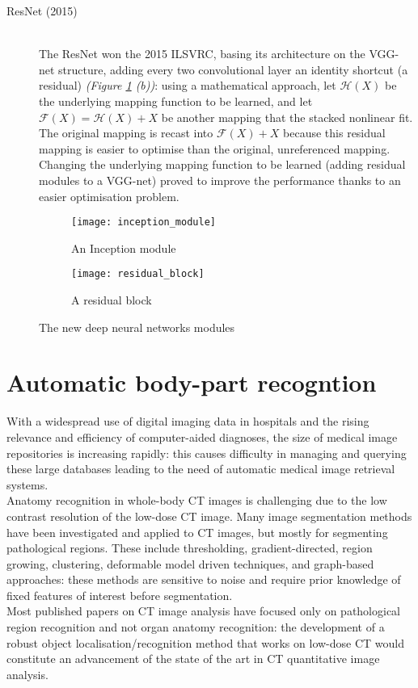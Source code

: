 \documentclass[../main.tex]{subfiles}
\begin{document}
\begin{description}
\item[ResNet (2015)] \cite{Wu2017} \hfill \\
The ResNet won the 2015 ILSVRC, basing its architecture on the VGG-net structure, adding every two convolutional layer an identity shortcut (a residual) \textit{(Figure \ref{fig:blocks} (b))}: using a mathematical approach, let $\mathcal {H}(X)$ be the underlying mapping function to be learned, and let $\mathcal{F}(X)=\mathcal {H}(X) + X $ be another mapping that the stacked nonlinear fit. The original mapping is recast into $\mathcal{F}(X)+X$ because this residual mapping is easier to optimise than the original, unreferenced mapping. \cite{Wu2017} \\
Changing the underlying mapping function to be learned (adding residual modules to a VGG-net) proved to improve the performance thanks to an easier optimisation problem.
\end{description}


\begin{figure}[H]
   \centering
    \begin{subfigure}{0.4\linewidth}
        \texttt{[image: inception\_module]}
        \caption{An Inception module} \cite{Szegedy2015}
    \end{subfigure}
    \begin{subfigure}{0.4\linewidth}
        \texttt{[image: residual\_block]}
        \caption{A residual block} \cite{Wu2017}
    \end{subfigure}
   
  \caption{The new deep neural networks modules}
  \label{fig:blocks}
\end{figure}


\clearpage
\newpage
\section{Automatic body-part recogntion}
With a widespread use of digital imaging data in hospitals and the rising relevance and efficiency of computer-aided diagnoses, the size of medical image repositories is increasing rapidly: this causes difficulty in managing and querying these large databases leading to the need of automatic medical image retrieval systems. \cite{Qayyum2017} \\

Anatomy recognition in whole-body CT images is challenging due to the low contrast resolution of the low-dose CT image. Many image segmentation methods have been investigated and applied to CT images, but mostly for segmenting pathological regions. These include thresholding, gradient-directed, region growing, clustering, deformable model driven techniques, and graph-based approaches\cite{Wang}: these methods are sensitive to noise and require prior knowledge of fixed features of interest before segmentation. \\
Most published papers on CT image analysis have focused only on pathological region recognition and not organ anatomy recognition: the development of a robust object localisation/recognition method that works on low-dose CT would constitute an advancement of the state of the art in CT quantitative image analysis.\cite{Wang}
\end{document}
